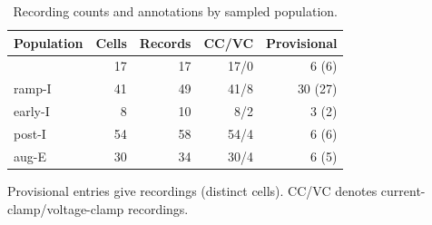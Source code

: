 \begin{table}[htbp]
\centering\small
\caption{Recording counts and annotations by sampled population.}
\label{tab:archive_summary}
\begin{tabular}{@{}lrrrr@{}}
\toprule
Population & Cells & Records & CC/VC & Provisional \\
\midrule
\preII{} & 17 & 17 & 17/0 & 6 (6) \\
ramp-I & 41 & 49 & 41/8 & 30 (27) \\
early-I & 8 & 10 & 8/2 & 3 (2) \\
post-I & 54 & 58 & 54/4 & 6 (6) \\
aug-E & 30 & 34 & 30/4 & 6 (5) \\
\bottomrule
\end{tabular}
\par\smallskip\begin{minipage}{\linewidth}\footnotesize Provisional entries give recordings (distinct cells). CC/VC denotes current-clamp/voltage-clamp recordings.\end{minipage}
\end{table}
